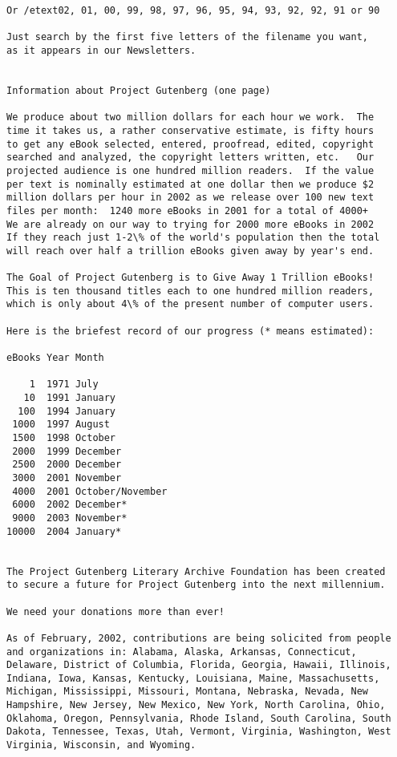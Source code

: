 \documentclass[oneside]{book}
\begin{document}
\begin{verbatim}
Or /etext02, 01, 00, 99, 98, 97, 96, 95, 94, 93, 92, 92, 91 or 90

Just search by the first five letters of the filename you want,
as it appears in our Newsletters.


Information about Project Gutenberg (one page)

We produce about two million dollars for each hour we work.  The
time it takes us, a rather conservative estimate, is fifty hours
to get any eBook selected, entered, proofread, edited, copyright
searched and analyzed, the copyright letters written, etc.   Our
projected audience is one hundred million readers.  If the value
per text is nominally estimated at one dollar then we produce $2
million dollars per hour in 2002 as we release over 100 new text
files per month:  1240 more eBooks in 2001 for a total of 4000+
We are already on our way to trying for 2000 more eBooks in 2002
If they reach just 1-2\% of the world's population then the total
will reach over half a trillion eBooks given away by year's end.

The Goal of Project Gutenberg is to Give Away 1 Trillion eBooks!
This is ten thousand titles each to one hundred million readers,
which is only about 4\% of the present number of computer users.

Here is the briefest record of our progress (* means estimated):

eBooks Year Month

    1  1971 July
   10  1991 January
  100  1994 January
 1000  1997 August
 1500  1998 October
 2000  1999 December
 2500  2000 December
 3000  2001 November
 4000  2001 October/November
 6000  2002 December*
 9000  2003 November*
10000  2004 January*


The Project Gutenberg Literary Archive Foundation has been created
to secure a future for Project Gutenberg into the next millennium.

We need your donations more than ever!

As of February, 2002, contributions are being solicited from people
and organizations in: Alabama, Alaska, Arkansas, Connecticut,
Delaware, District of Columbia, Florida, Georgia, Hawaii, Illinois,
Indiana, Iowa, Kansas, Kentucky, Louisiana, Maine, Massachusetts,
Michigan, Mississippi, Missouri, Montana, Nebraska, Nevada, New
Hampshire, New Jersey, New Mexico, New York, North Carolina, Ohio,
Oklahoma, Oregon, Pennsylvania, Rhode Island, South Carolina, South
Dakota, Tennessee, Texas, Utah, Vermont, Virginia, Washington, West
Virginia, Wisconsin, and Wyoming.


\end{verbatim}
\end{document}
